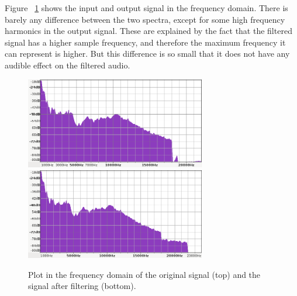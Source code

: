 Figure ~\ref{fig:spectrum} shows the input and output signal in the frequency domain. There is barely any difference between the two spectra, except for some high frequency harmonics in the output signal. These are explained by the fact that the filtered signal has a higher sample frequency, and therefore the maximum frequency it can represent is higher. But this difference is so small that it does not have any audible effect on the filtered audio.

\begin{figure}
\begin{center}
\includegraphics[width=0.7\textwidth]{images/music-input-spectrum.png}
\includegraphics[width=0.7\textwidth]{images/music-output-spectrum.png}
\caption{Plot in the frequency domain of the original signal (top) and the signal after filtering (bottom).}
\label{fig:spectrum}
\end{center}
\end{figure}
